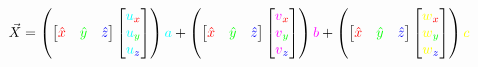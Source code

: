 \documentclass[preview]{standalone}
\begin{document}
$$\vec{X} =
\left(\begin{bmatrix}\textcolor[HTML]{FF0000}{\hat{x}}&\textcolor[HTML]{00FF00}{\hat{y}}&\textcolor[HTML]{0000FF}{\hat{z}}\end{bmatrix}\begin{bmatrix}\textcolor[HTML]{00FFFF}{u}_{\textcolor[HTML]{FF0000}{x}}\\\textcolor[HTML]{00FFFF}{u}_{\textcolor[HTML]{00FF00}{y}}\\\textcolor[HTML]{00FFFF}{u}_{\textcolor[HTML]{0000FF}{z}}\end{bmatrix}\right)\textcolor[HTML]{00FFFF}{a} +
\left(\begin{bmatrix}\textcolor[HTML]{FF0000}{\hat{x}}&\textcolor[HTML]{00FF00}{\hat{y}}&\textcolor[HTML]{0000FF}{\hat{z}}\end{bmatrix}\begin{bmatrix}\textcolor[HTML]{FF00FF}{v}_{\textcolor[HTML]{FF0000}{x}}\\\textcolor[HTML]{FF00FF}{v}_{\textcolor[HTML]{00FF00}{y}}\\\textcolor[HTML]{FF00FF}{v}_{\textcolor[HTML]{0000FF}{z}}\end{bmatrix}\right)\textcolor[HTML]{FF00FF}{b} +
\left(\begin{bmatrix}\textcolor[HTML]{FF0000}{\hat{x}}&\textcolor[HTML]{00FF00}{\hat{y}}&\textcolor[HTML]{0000FF}{\hat{z}}\end{bmatrix}\begin{bmatrix}\textcolor[HTML]{FFFF00}{w}_{\textcolor[HTML]{FF0000}{x}}\\\textcolor[HTML]{FFFF00}{w}_{\textcolor[HTML]{00FF00}{y}}\\\textcolor[HTML]{FFFF00}{w}_{\textcolor[HTML]{0000FF}{z}}\end{bmatrix}\right)\textcolor[HTML]{FFFF00}{c}$$
\end{document}
